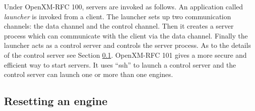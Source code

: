 Under OpenXM-RFC 100, servers are invoked as follows.
An application called {\it launcher} is invoked from a client.
The launcher sets up two communication channels: the data channel 
and the control channel. 
Then it creates a server process which can communicate
with the client via the data channel. Finally the launcher
acts as a control server and controls the server process.
As to the details of the control server see Section \ref{control}.
OpenXM-RFC 101\cite{ox-rfc-101} gives a more secure and
efficient way to start servers.
It uses ``ssh'' to launch a control server and 
the control server can launch one or more than one
engines.

\subsection{Resetting an engine}
\label{control}
%
%


